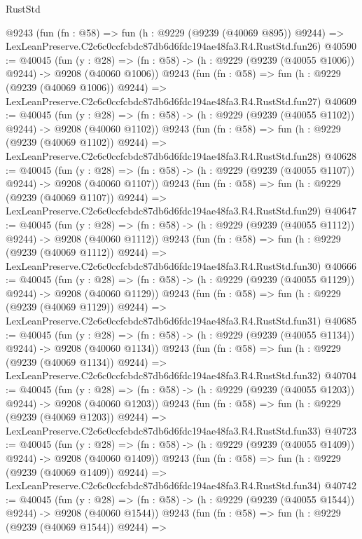\begin{lexlean}{RustStd}
\begin{coremodule}
    @9243
    (fun (fn : @58) =>
    fun (h : @9229 (@9239 (@40069 @895)) @9244) =>
    LexLeanPreserve.C2c6c0ccfcbdc87db6d6fdc194ae48fa3.R4.RustStd.fun26)
@40590 := @40045
    (fun (y : @28) =>
    (fn : @58) -> (h : @9229 (@9239 (@40055 @1006)) @9244) -> @9208 (@40060 @1006))
    @9243
    (fun (fn : @58) =>
    fun (h : @9229 (@9239 (@40069 @1006)) @9244) =>
    LexLeanPreserve.C2c6c0ccfcbdc87db6d6fdc194ae48fa3.R4.RustStd.fun27)
@40609 := @40045
    (fun (y : @28) =>
    (fn : @58) -> (h : @9229 (@9239 (@40055 @1102)) @9244) -> @9208 (@40060 @1102))
    @9243
    (fun (fn : @58) =>
    fun (h : @9229 (@9239 (@40069 @1102)) @9244) =>
    LexLeanPreserve.C2c6c0ccfcbdc87db6d6fdc194ae48fa3.R4.RustStd.fun28)
@40628 := @40045
    (fun (y : @28) =>
    (fn : @58) -> (h : @9229 (@9239 (@40055 @1107)) @9244) -> @9208 (@40060 @1107))
    @9243
    (fun (fn : @58) =>
    fun (h : @9229 (@9239 (@40069 @1107)) @9244) =>
    LexLeanPreserve.C2c6c0ccfcbdc87db6d6fdc194ae48fa3.R4.RustStd.fun29)
@40647 := @40045
    (fun (y : @28) =>
    (fn : @58) -> (h : @9229 (@9239 (@40055 @1112)) @9244) -> @9208 (@40060 @1112))
    @9243
    (fun (fn : @58) =>
    fun (h : @9229 (@9239 (@40069 @1112)) @9244) =>
    LexLeanPreserve.C2c6c0ccfcbdc87db6d6fdc194ae48fa3.R4.RustStd.fun30)
@40666 := @40045
    (fun (y : @28) =>
    (fn : @58) -> (h : @9229 (@9239 (@40055 @1129)) @9244) -> @9208 (@40060 @1129))
    @9243
    (fun (fn : @58) =>
    fun (h : @9229 (@9239 (@40069 @1129)) @9244) =>
    LexLeanPreserve.C2c6c0ccfcbdc87db6d6fdc194ae48fa3.R4.RustStd.fun31)
@40685 := @40045
    (fun (y : @28) =>
    (fn : @58) -> (h : @9229 (@9239 (@40055 @1134)) @9244) -> @9208 (@40060 @1134))
    @9243
    (fun (fn : @58) =>
    fun (h : @9229 (@9239 (@40069 @1134)) @9244) =>
    LexLeanPreserve.C2c6c0ccfcbdc87db6d6fdc194ae48fa3.R4.RustStd.fun32)
@40704 := @40045
    (fun (y : @28) =>
    (fn : @58) -> (h : @9229 (@9239 (@40055 @1203)) @9244) -> @9208 (@40060 @1203))
    @9243
    (fun (fn : @58) =>
    fun (h : @9229 (@9239 (@40069 @1203)) @9244) =>
    LexLeanPreserve.C2c6c0ccfcbdc87db6d6fdc194ae48fa3.R4.RustStd.fun33)
@40723 := @40045
    (fun (y : @28) =>
    (fn : @58) -> (h : @9229 (@9239 (@40055 @1409)) @9244) -> @9208 (@40060 @1409))
    @9243
    (fun (fn : @58) =>
    fun (h : @9229 (@9239 (@40069 @1409)) @9244) =>
    LexLeanPreserve.C2c6c0ccfcbdc87db6d6fdc194ae48fa3.R4.RustStd.fun34)
@40742 := @40045
    (fun (y : @28) =>
    (fn : @58) -> (h : @9229 (@9239 (@40055 @1544)) @9244) -> @9208 (@40060 @1544))
    @9243
    (fun (fn : @58) =>
    fun (h : @9229 (@9239 (@40069 @1544)) @9244) =>

\end{coremodule}
\end{lexlean}
